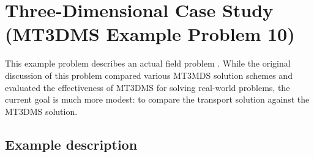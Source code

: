\section{Three-Dimensional Case Study (MT3DMS Example Problem 10)}

This example problem describes an actual field problem \citep{zheng1999mt3dms}.  While the original discussion of this problem compared various MT3MDS solution schemes and evaluated the effectiveness of MT3DMS for solving real-world problems, the current goal is much more modest: to compare the \mf transport solution against the MT3DMS solution.  

\subsection{Example description}

